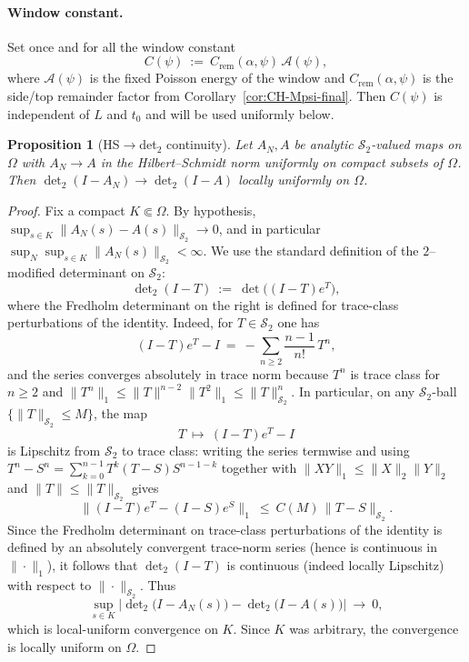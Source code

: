 \documentclass[11pt]{article}
\newtheorem{proposition}[theorem]{Proposition}
\theoremstyle{definition}
\theoremstyle{remark}
\theoremstyle{definition}
\newcommand{\HS}{\mathcal{S}_2}
\begin{document}
\paragraph{Window constant.}
Set once and for all the window constant
\[
  C(\psi)\ :=\ C_{\mathrm{rem}}(\alpha,\psi)\,\mathcal A(\psi),
\]
where $\mathcal A(\psi)$ is the fixed Poisson energy of the window and $C_{\mathrm{rem}}(\alpha,\psi)$ is the side/top remainder factor from Corollary~\ref{cor:CH-Mpsi-final}. Then $C(\psi)$ is independent of $L$ and $t_0$ and will be used uniformly below.
\begin{proposition}[HS$\to$det$_2$ continuity]\label{prop:hs-det2-continuity}
Let $A_N,A$ be analytic $\HS$-valued maps on $\Omega$ with $A_N\to A$ in the Hilbert–Schmidt norm uniformly on compact subsets of $\Omega$. Then $\det\nolimits_2(I-A_N)\to\det\nolimits_2(I-A)$ locally uniformly on $\Omega$.
\end{proposition}
\begin{proof}
Fix a compact $K\Subset\Omega$. By hypothesis, $\sup_{s\in K}\|A_N(s)-A(s)\|_{\HS}\to0$, and in particular $\sup_{N}\sup_{s\in K}\|A_N(s)\|_{\HS}<\infty$.
We use the standard definition of the $2$--modified determinant on $\HS$:
\[
  \det\nolimits_2(I-T)\ :=\ \det\!\big((I-T)e^T\big),
\]
where the Fredholm determinant on the right is defined for trace-class perturbations of the identity. Indeed, for $T\in\HS$ one has
\[
  (I-T)e^T-I\ =\ -\sum_{n\ge 2}\frac{n-1}{n!}\,T^n,
\]
and the series converges absolutely in trace norm because $T^n$ is trace class for $n\ge 2$ and
$\|T^n\|_1\le \|T\|^{n-2}\|T^2\|_1\le \|T\|_{\HS}^n$.
In particular, on any $\HS$-ball $\{ \|T\|_{\HS}\le M\}$, the map
\[
  T\ \longmapsto\ (I-T)e^T-I
\]
is Lipschitz from $\HS$ to trace class: writing the series termwise and using
$T^n-S^n=\sum_{k=0}^{n-1}T^k(T-S)S^{n-1-k}$ together with $\|XY\|_1\le \|X\|_2\|Y\|_2$ and $\|T\|\le \|T\|_{\HS}$ gives
\[
  \|(I-T)e^T-(I-S)e^S\|_1\ \le\ C(M)\,\|T-S\|_{\HS}.
\]
Since the Fredholm determinant on trace-class perturbations of the identity is defined by an absolutely convergent trace-norm series (hence is continuous in $\|\cdot\|_1$), it follows that $\det_2(I-T)$ is continuous (indeed locally Lipschitz) with respect to $\|\cdot\|_{\HS}$.
Thus
\[
  \sup_{s\in K}\Big|\det\nolimits_2\big(I-A_N(s)\big)-\det\nolimits_2\big(I-A(s)\big)\Big|\ \longrightarrow\ 0,
\]
which is local-uniform convergence on $K$. Since $K$ was arbitrary, the convergence is locally uniform on $\Omega$.
\end{proof}
\end{document}
